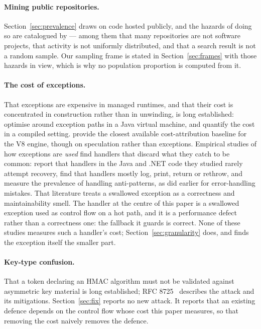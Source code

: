 \documentclass[pdflatex,sn-basic,twocolumn]{sn-jnl}%
\begin{document}
\paragraph{Mining public repositories.} Section~\ref{sec:prevalence} draws on
code hosted publicly, and the hazards of doing so are catalogued by
\citet{kalliamvakou2014promises} --- among them that many
repositories are not software projects, that activity is not uniformly
distributed, and that a search result is not a random sample. Our sampling
frame is stated in Section~\ref{sec:frames} with those hazards in view, which
is why no population proportion is computed from it.

\paragraph{The cost of exceptions.} That exceptions are expensive in managed
runtimes, and that their cost is concentrated in construction rather than in
unwinding, is long established: \citet{ogasawara2006edo}
optimise around exception paths in a Java virtual machine, and \citet{renwick2019lowcost} quantify the cost in a compiled setting.
\citet{parravicini2021cost} provide the closest
available cost-attribution baseline for the V8 engine, though on speculation
rather than exceptions. Empirical studies of how exceptions are \emph{used}
find handlers that discard what they catch to be common: \citet{cabral2007exception} report that handlers in the Java and .NET
code they studied rarely attempt recovery, \citet{kery2016examining} find that handlers mostly log, print, return or
rethrow, and \citet{depadua2017prevalence} measure the
prevalence of handling anti-patterns, as \citet{weimer2004finding} did earlier for error-handling mistakes. That
literature treats a swallowed exception as a correctness and maintainability
smell. The handler at the centre of this paper is a swallowed exception used as
control flow on a hot path, and it is a performance defect rather than a
correctness one: the fallback it guards is correct. None of these studies
measures such a handler's cost; Section~\ref{sec:granularity} does, and finds
the exception itself the smaller part.

\paragraph{Key-type confusion.} That a token declaring an HMAC algorithm must
not be validated against asymmetric key material is long established; RFC
8725~\citep{rfc8725} describes the attack and its mitigations.
Section~\ref{sec:fix} reports no new attack. It reports that an existing
defence depends on the control flow whose cost this paper measures, so that
removing the cost naively removes the defence.
\end{document}
